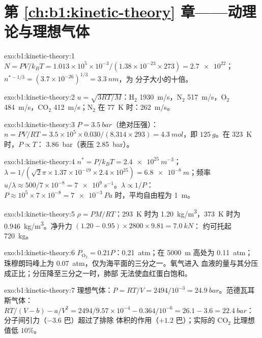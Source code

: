 \section*{第 \ref{ch:b1:kinetic-theory} 章——动理论与理想气体}

\begin{solution}{exo:b1:kinetic-theory:1}
$N = PV/k_BT = 1.013\times10^5 \times 10^{-3}/(1.38\times10^{-23} \times 273) =
\num{2.7e22}$；$n^{*-1/3} = (3.7\times10^{-26})^{1/3} = \qty{3.3}{nm}$，为
分子大小的十倍。
\end{solution}

\begin{solution}{exo:b1:kinetic-theory:2}
$u = \sqrt{3RT/M}$：H$_2$ \qty{1930}{m/s}，N$_2$ \qty{517}{m/s}，O$_2$
\qty{484}{m/s}，CO$_2$ \qty{412}{m/s}；N$_2$ 在 \qty{77}{K} 时：\qty{262}{m/s}。
\end{solution}

\begin{solution}{exo:b1:kinetic-theory:3}
$P = \qty{3.5}{bar}$（绝对压强）：$n = PV/RT = 3.5\times10^5 \times 0.030/(8.314
\times 293) = \qty{4.3}{mol}$，即 $\qty{125}{g}$。在 \qty{323}{K} 时，$P \propto T$：
\qty{3.86}{bar}（表压 \qty{2.85}{bar}）。
\end{solution}

\begin{solution}{exo:b1:kinetic-theory:4}
$n^* = P/k_BT = \qty{2.4e25}{m^{-3}}$；$\lambda = 1/(\sqrt2\pi \times 1.37\times
10^{-19} \times 2.4\times10^{25}) = \qty{6.8e-8}{m}$；频率 $u/\lambda \approx
500/7\times10^{-8} = \qty{7e9}{s^{-1}}$。$\lambda \propto 1/P$：
$P \approx 10^5 \times 7\times10^{-8} = \qty{7e-3}{Pa}$ 时，平均自由程为 \qty{1}{m}。
\end{solution}

\begin{solution}{exo:b1:kinetic-theory:5}
$\rho = PM/RT$：\qty{293}{K} 时为 \qty{1.20}{kg/m^3}，\qty{373}{K} 时为
\qty{0.946}{kg/m^3}。净升力 $(1.20 - 0.95) \times 2800 \times 9.81 = \qty{7.0}{kN}$：
约可托起 \qty{720}{kg}。
\end{solution}

\begin{solution}{exo:b1:kinetic-theory:6}
$P_{\mathrm{O}_2} = 0.21P$：\qty{0.21}{atm}；在 \qty{5000}{m} 高处为 \qty{0.11}{atm}；
珠穆朗玛峰上为 \qty{0.07}{atm}，仅为海平面的三分之一。氧气进入
血液的量与其分压成正比；分压降至三分之一时，肺部
无法使血红蛋白饱和。
\end{solution}

\begin{solution}{exo:b1:kinetic-theory:7}
理想气体：$P = RT/V = 2494/10^{-3} = \qty{24.9}{bar}$。范德瓦耳斯气体：
$RT/(V - b) - a/V^2 = 2494/9.57\times10^{-4} - 0.364/10^{-6} = 26.1 - 3.6 =
\qty{22.4}{bar}$：分子间引力（$-3.6$ 巴）超过了排除
体积的作用（$+1.2$ 巴）；实际的 CO$_2$ 比理想值低 $10\%$。
\end{solution}

